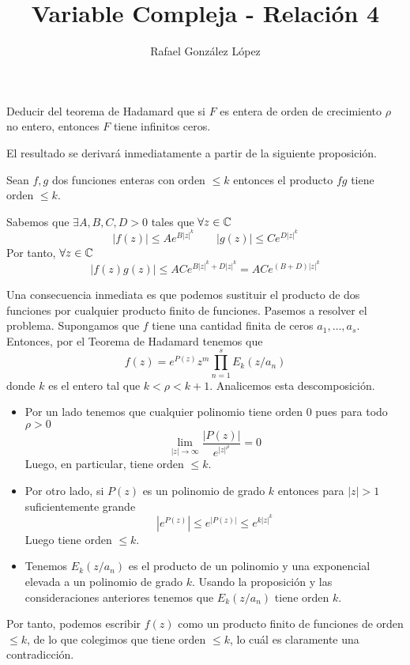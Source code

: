 \documentclass[twoside]{article}
\begin{document}
\title{Variable Compleja - Relación 4}
\author{Rafael González López}
\maketitle
\begin{ejercicio}{7}
Deducir del teorema de Hadamard que si $F$ es entera de orden de crecimiento $\rho$ no entero, entonces $F$ tiene infinitos ceros.
\end{ejercicio}
\begin{solucion}
El resultado se derivará inmediatamente a partir de la siguiente proposición. 
\begin{prop}
Sean $f,g$ dos funciones enteras con orden $\leq k$ entonces el producto $fg$ tiene orden $\leq k$.
\end{prop}
\begin{dem}
Sabemos que $\exists A,B,C,D>0$ tales que $\forall z\in \mathbb{C}$
$$
|f(z)|\leq Ae^{B|z|^k} \qquad |g(z)|\leq Ce^{D|z|^k}
$$
Por tanto, $\forall z \in \mathbb{C}$
$$
|f(z)g(z)| \leq ACe^{B|z|^k+D|z|^k} = ACe^{(B+D)|z|^k}
$$
\end{dem}
Una consecuencia inmediata es que podemos sustituir el producto de dos funciones por cualquier producto finito de funciones. Pasemos a resolver el problema. Supongamos que $f$ tiene una cantidad finita de ceros $a_1,\dotsc,a_s$. Entonces, por el Teorema de Hadamard tenemos que
$$
f(z)=e^{P(z)}z^m\prod_{n=1}^s E_k(z/a_n)
$$
donde $k$ es el entero tal que $k<\rho<k+1$. Analicemos esta descomposición. 
\begin{itemize}
\item Por un lado tenemos que cualquier polinomio tiene orden $0$ pues para todo $\rho>0$
$$
\lim_{|z|\to\infty} \frac{|P(z)|}{e^{|z|^\rho}} = 0
$$
Luego, en particular, tiene orden $\leq k$.
\item Por otro lado, si $P(z)$ es un polinomio de grado $k$ entonces para $|z|>1$ suficientemente grande
$$
|e^{P(z)}|\leq e^{|P(z)|}\leq e^{k|z|^k}
$$
Luego tiene orden $\leq k$. 
\item Tenemos $E_k(z/a_n)$ es el producto de un polinomio y una exponencial elevada a un polinomio de grado $k$. Usando la proposición y las consideraciones anteriores tenemos que $E_k(z/a_n)$ tiene orden $k$. 
\end{itemize}
Por tanto, podemos escribir $f(z)$ como un producto finito de funciones de orden $\leq k$, de lo que colegimos que tiene orden $\leq k$, lo cuál es claramente una contradicción.
\end{solucion}
\end{document}
